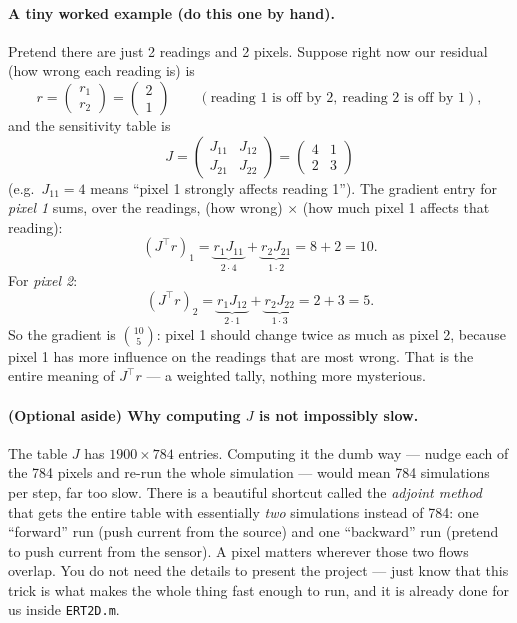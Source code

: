\documentclass[11pt]{article}
\begin{document}
\paragraph{A tiny worked example (do this one by hand).} Pretend there are
just 2 readings and 2 pixels. Suppose right now our residual (how wrong each
reading is) is
\[
r = \begin{pmatrix} r_1 \\ r_2 \end{pmatrix}
  = \begin{pmatrix} 2 \\ 1 \end{pmatrix}
  \qquad(\text{reading 1 is off by }2,\ \text{reading 2 is off by }1),
\]
and the sensitivity table is
\[
J = \begin{pmatrix} J_{11} & J_{12} \\ J_{21} & J_{22}\end{pmatrix}
  = \begin{pmatrix} 4 & 1 \\ 2 & 3 \end{pmatrix}
\]
(e.g.\ $J_{11}=4$ means ``pixel 1 strongly affects reading 1''). The gradient
entry for \emph{pixel 1} sums, over the readings, (how wrong) $\times$ (how
much pixel 1 affects that reading):
\[
(J^\top r)_1 = \underbrace{r_1 J_{11}}_{2\cdot 4} + \underbrace{r_2 J_{21}}_{1\cdot 2}
= 8 + 2 = 10 .
\]
For \emph{pixel 2}:
\[
(J^\top r)_2 = \underbrace{r_1 J_{12}}_{2\cdot 1} + \underbrace{r_2 J_{22}}_{1\cdot 3}
= 2 + 3 = 5 .
\]
So the gradient is $\binom{10}{5}$: pixel 1 should change twice as much as
pixel 2, because pixel 1 has more influence on the readings that are most
wrong. That is the entire meaning of $J^\top r$ --- a weighted tally, nothing
more mysterious.

\paragraph{(Optional aside) Why computing $J$ is not impossibly slow.} The
table $J$ has $1900\times784$ entries. Computing it the dumb way --- nudge each
of the 784 pixels and re-run the whole simulation --- would mean 784
simulations per step, far too slow. There is a beautiful shortcut called the
\emph{adjoint method} that gets the entire table with essentially \emph{two}
simulations instead of 784: one ``forward'' run (push current from the source)
and one ``backward'' run (pretend to push current from the sensor). A pixel
matters wherever those two flows overlap. You do not need the details to
present the project --- just know that this trick is what makes the whole thing
fast enough to run, and it is already done for us inside \texttt{ERT2D.m}.
\end{document}
